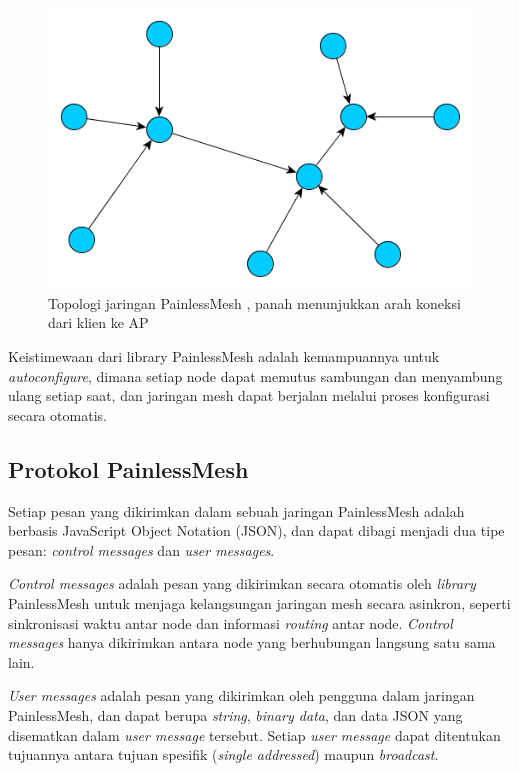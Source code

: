 \begin{figure}[h]
	\centering
	\includegraphics[scale=0.5]{./assets/painlessmesh}
	\caption{Topologi jaringan PainlessMesh \cite{HomeWikiPainlessMesh}, panah menunjukkan arah koneksi dari klien ke AP}
\end{figure}

Keistimewaan dari library PainlessMesh adalah kemampuannya untuk \textit{autoconfigure}, dimana setiap node dapat memutus sambungan dan menyambung ulang setiap saat, dan jaringan mesh dapat berjalan melalui proses konfigurasi secara otomatis.

\subsection{Protokol PainlessMesh}
Setiap pesan yang dikirimkan dalam sebuah jaringan PainlessMesh adalah berbasis JavaScript Object Notation (JSON), dan dapat dibagi menjadi dua tipe pesan: \textit{control messages} dan \textit{user messages}.

\textit{Control messages} adalah pesan yang dikirimkan secara otomatis oleh \textit{library} PainlessMesh untuk menjaga kelangsungan jaringan mesh secara asinkron, seperti sinkronisasi waktu antar node dan informasi \textit{routing} antar node. \textit{Control messages} hanya dikirimkan antara node yang berhubungan langsung satu sama lain.

\textit{User messages} adalah pesan yang dikirimkan oleh pengguna dalam jaringan PainlessMesh, dan dapat berupa \textit{string}, \textit{binary data}, dan data JSON yang disematkan dalam \textit{user message} tersebut. Setiap \textit{user message} dapat ditentukan tujuannya antara tujuan spesifik (\textit{single addressed}) maupun \textit{broadcast}.

